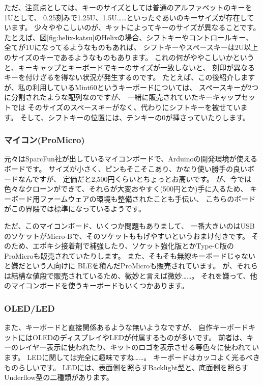 \documentclass[mingoth,a4paper]{jsarticle}
\begin{document}
ただ、注意点としては、キーのサイズとしては普通のアルファベットのキーを1Uとして、
0.25刻みで1.25U、1.5U……といったぐあいのキーサイズが存在しています。
少々ややこしいのが、キットによってキーのサイズが異なることです。
たとえば、図\ref{fig:helix-katsu}のHelixの場合、シフトキーやコントロールキー、
全てが1Uになってるようなものもあれば、
シフトキーやスペースキーは2U以上のサイズのキーであるようなものもあります。
これの何がややこしいかというと、キーキャップとキーボードでキーのサイズが一致しないと、
刻印が異なるキーを付けざるを得ない状況が発生するのです。
たとえば、この後紹介しますが、私の利用しているMint60というキーボードについては、
スペースキーが2つに分割されたような配列なのですが、
一緒に販売されていたキーキャップセットでは
そのサイズのスペースキーがなく、代わりにシフトキーを被せています。
そして、シフトキーの位置には、テンキーの0が挿さっていたりします。

\subsubsection*{マイコン(ProMicro)}

元々はSparcFun社が出しているマイコンボードで、Arduinoの開発環境が使えるボードです。
サイズが小さく、ピンもそこそこあり、かなり使い勝手の良いボードなんですが、
定価だと2,500円くらいとちょっとお高いです。
が、今では色々なクローンができて、それらが大変おやすく(500円とか)手に入るため、
キーボード用ファームウェアの環境も整備されたことも手伝い、
こちらのボードがこの界隈では標準になっているようです。

ただ、このマイコンボード、いくつか問題もありまして、
一番大きいのはUSBのソケットがMicro-Bで、そのソケットももげやすいというおまけ付きです。
そのため、エポキシ接着剤で補強したり、ソケット強化版とかType-C版のProMicroも販売されていたりします。
また、そもそも無線キーボードじゃないと嫌だという人向けに
BLEを積んだProMicroも販売されています。
が、それらは結構な値段で販売されているため、微妙と言えば微妙……。
それを嫌って、他のマイコンボードを使うキーボードもいくつかあります。

\subsubsection*{OLED/LED}

また、キーボードと直接関係あるような無いようなですが、
自作キーボードキットにはOLEDのディスプレイやLEDが付属するものが多いです。
前者は、キーのレイヤー表示に使われたり、キットのロゴを表示させる等色々に使われています。
LEDに関しては完全に趣味ですね……。
キーボードはカッコよく光るべきものらしいです。
LEDには、表面側を照らすBacklight型と、底面側を照らすUnderflow型の二種類があります。
\end{document}
